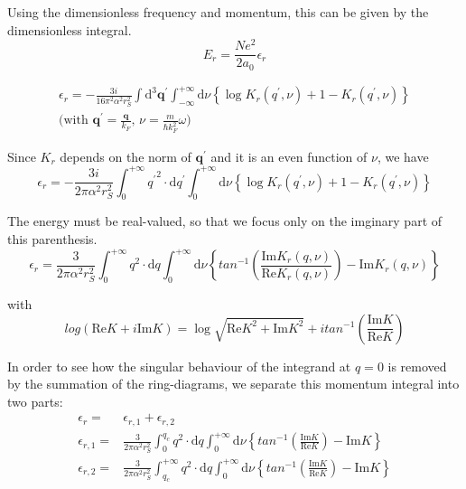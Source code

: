 Using the dimensionless frequency and momentum, this can be given by the dimensionless integral.
\begin{equation} \label{Eqs2.8.36}
E_r = \frac{N e^2}{2 a_0} \epsilon_r
\end{equation}

\[\begin{split} \epsilon_r = -\frac{3i}{16\pi^2 \alpha^2 r_S^2} \int \mathrm{d}^3 \mathbf{q}^{'}\int_{-\infty}^{+\infty} \mathrm{d}\nu \left\{ \log K_r(q^{'},\nu) + 1-K_r(q^{'},\nu) \right\}\\\text{(with $\mathbf{q}^{'} = \frac{\mathbf{q}}{k_F}$, $\nu = \frac{m}{\hbar k_F^2} \omega$)}\end{split} \]

Since $K_r$ depends on the norm of $\mathbf{q}^{'}$ and it is an even function of $\nu$, we have
\[ \epsilon_r = -\frac{3i}{2\pi \alpha^2 r_S^2} \int_0^{+\infty} {q^{'}}^2 \cdot \mathrm{d}q^{'} \int_{0}^{+\infty} \mathrm{d}\nu \left\{ \log K_r(q^{'},\nu) + 1-K_r(q^{'},\nu) \right\}\]

The energy must be real-valued, so that we focus only on the imginary part of this parenthesis.
\begin{equation} \label{Eqs2.8.37}
\epsilon_r = \frac{3}{2\pi \alpha^2 r_S^2} \int_0^{+\infty} q^2 \cdot \mathrm{d}q \int_0^{+\infty} \mathrm{d}\nu \left\{ tan^{-1}\left( \frac{\text{Im} K_r(q,\nu)}{\text{Re} K_r(q,\nu)} \right) - \text{Im} K_r(q,\nu) \right\}
\end{equation}

with
\begin{equation} \label{Eqs2.8.38}
log(\text{Re} K + i \text{Im} K) = \log \sqrt{\text{Re} K^2 + \text{Im} K^2} + i tan^{-1} \left( \frac{\text{Im} K}{\text{Re} K} \right)
\end{equation}

In order to see how the singular behaviour of the integrand at $q=0$ is removed by the summation of the ring-diagrams, we separate this momentum integral into two parts:
\begin{eqnarray}
\epsilon_r =& \epsilon_{r,1} + \epsilon_{r,2} \nonumber\\
\epsilon_{r,1} =& \frac{3}{2\pi \alpha^2 r_S^2} \int_0^{q_c} q^2 \cdot \mathrm{d} q \int_0^{+\infty} \mathrm{d} \nu \left\{ tan^{-1}\left( \frac{\text{Im} K}{\text{Re} K} \right) - \text{Im} K  \right\} \label{Eqs2.8.39}\\
\epsilon_{r,2} =& \frac{3}{2\pi \alpha^2 r_S^2} \int_{q_c}^{+\infty} q^2 \cdot \mathrm{d} q \int_0^{+\infty} \mathrm{d} \nu \left\{ tan^{-1}\left( \frac{\text{Im} K}{\text{Re} K} \right) - \text{Im} K  \right\} \label{Eqs2.8.40}
\end{eqnarray}

